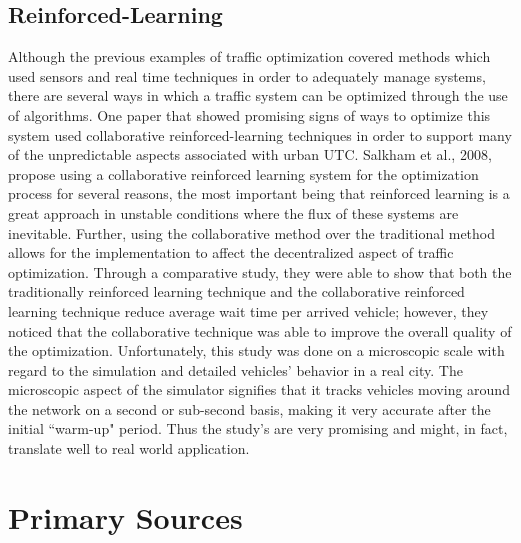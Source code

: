 \subsection{Reinforced-Learning}
Although the previous examples of traffic optimization covered methods which used sensors and real time techniques in order to adequately manage systems, there are several ways in which a traffic system can be optimized through the use of algorithms.  One paper that showed promising signs of ways to optimize this system used collaborative reinforced-learning techniques in order to support many of the unpredictable aspects associated with urban UTC.  Salkham et al., 2008, propose using a collaborative reinforced learning system for the optimization process for several reasons, the most important being that reinforced learning is a great approach in unstable conditions where the flux of these systems are inevitable.  Further, using the collaborative method over the traditional method allows for the implementation to affect the decentralized aspect of traffic optimization. Through a comparative study, they were able to show that both the traditionally reinforced learning technique and the collaborative reinforced learning technique reduce average wait time per arrived vehicle; however, they noticed that the collaborative technique was able to improve the overall quality of the optimization.  Unfortunately, this study was done on a microscopic scale with regard to the simulation and detailed vehicles' behavior in a real city.  The microscopic aspect of the simulator signifies that it tracks vehicles moving around the network on a second or sub-second basis, making it very accurate after the initial ``warm-up" period.  Thus the study's are very promising and might, in fact, translate well to real world application\cite{CRL}.  


\section{Primary Sources}

